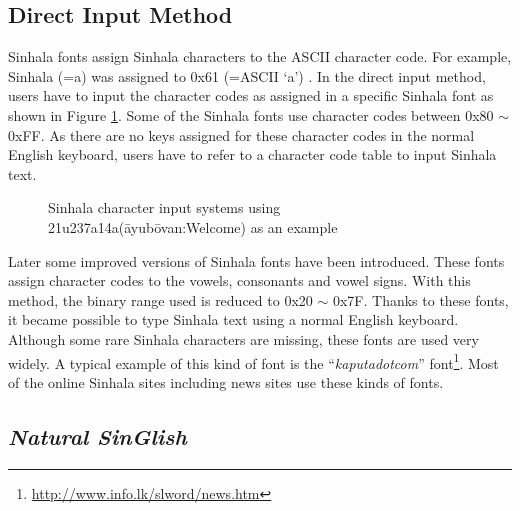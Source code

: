 \documentclass[english]{jnlp_1.3e}
\begin{document}
\subsection{Direct Input Method}

Sinhala fonts assign Sinhala  characters  to the ASCII character code. For example,  Sinhala {\SHa{}} (=a) was assigned to 0x61  (=ASCII `a') . 
In the direct input method, users have to input the character codes as assigned in a specific Sinhala font as shown in Figure \ref{fig:image}.
Some of the Sinhala fonts use character codes between 0x80 $\sim$ 0xFF.
As there are no keys assigned for these character codes in the normal English keyboard, users have to refer to a character code table to input Sinhala text.

\begin{figure}[b]

\caption{Sinhala character input systems using {\SHa{}}{\SHb\char21u}{\SHa{}\char237a}{\SHb\char14a}{\SHa{}}(\={a}yub\={o}van:Welcome) as an example}
\label{fig:image}
\end{figure}

Later some improved versions of Sinhala fonts have been introduced. 
These fonts assign character  codes  to the vowels, consonants and vowel signs. 
With this method, the binary range used is reduced to 0x20 $\sim$ 0x7F. 
Thanks to these fonts, it became possible to type Sinhala text using a normal English keyboard. 
Although some rare Sinhala characters are missing, these fonts are used very widely. 
A typical example of this kind of  font  is the ``{\it kaputadotcom}''  font\footnote{\url{http://www.info.lk/slword/news.htm}}. Most of the online Sinhala sites including news sites use these kinds of fonts.



\subsection{\itshape Natural SinGlish}
\end{document}
